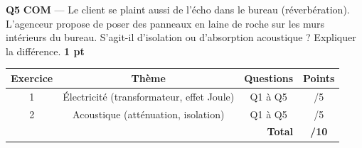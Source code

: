 \documentclass[a4paper,11pt]{article}
\newcommand{\pts}[1]{\hfill\textcolor{gris}{\small\textbf{#1}}}
\newcommand{\comp}[1]{\colorbox{blue!10}{\scriptsize\textbf{#1}}}
\begin{document}
\begin{reponsebox}[3.5cm]
\dotfill

\dotfill

\dotfill

\dotfill
\end{reponsebox}

\textbf{Q5} \comp{COM} — Le client se plaint aussi de l'écho dans le bureau (réverbération). L'agenceur propose de poser des panneaux en laine de roche sur les murs intérieurs du bureau. S'agit-il d'isolation ou d'absorption acoustique ? Expliquer la différence. \pts{1 pt}

\begin{reponsebox}[4cm]
\end{reponsebox}

\vfill

\begin{center}
\begin{tabular}{|c|c|c|c|}
\hline
\textbf{Exercice} & \textbf{Thème} & \textbf{Questions} & \textbf{Points} \\
\hline
1 & Électricité (transformateur, effet Joule) & Q1 à Q5 & /5 \\
\hline
2 & Acoustique (atténuation, isolation) & Q1 à Q5 & /5 \\
\hline
\multicolumn{3}{|r|}{\textbf{Total}} & \textbf{/10} \\
\hline
\end{tabular}
\end{center}
\end{document}
